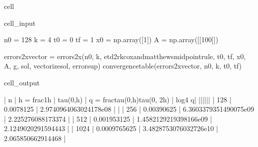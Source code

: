 \documentclass[letterpaper,10pt,english]{jupyterBook}
\begin{document}
\begin{sphinxuseclass}{cell}\begin{sphinxVerbatimInput}

\begin{sphinxuseclass}{cell_input}
\begin{sphinxVerbatim}[commandchars=\\\{\}]
n0 = 128
k = 4
t0 = 0
tf = 1
x0 = np.array([1])
A = np.array([[100]])

errors\PYGZus{}2x\PYGZus{}vector = errors\PYGZus{}2x(n0, k, etd2rk\PYGZus{}cox\PYGZus{}and\PYGZus{}matthews\PYGZus{}midpoint\PYGZus{}rule, t0, tf, x0, A, g, sol, vectorize\PYGZus{}sol, error\PYGZus{}sup)
convergence\PYGZus{}table(errors\PYGZus{}2x\PYGZus{}vector, n0, k, t0, tf)
\end{sphinxVerbatim}

\end{sphinxuseclass}\end{sphinxVerbatimInput}
\begin{sphinxVerbatimOutput}

\begin{sphinxuseclass}{cell_output}
\begin{sphinxVerbatim}[commandchars=\\\{\}]
| n | h = \PYGZdl{}\PYGZbs{}frac\PYGZob{}1\PYGZcb{}\PYGZob{}h\PYGZcb{}\PYGZdl{} | \PYGZdl{}\PYGZbs{}tau(0,h)\PYGZdl{} | q = \PYGZdl{}\PYGZbs{}frac\PYGZob{}tau(0,h)\PYGZcb{}\PYGZob{}tau(0, 2h)\PYGZcb{}\PYGZdl{} | \PYGZdl{}log\PYGZus{}4 \PYGZca{}q\PYGZdl{}|
|\PYGZhy{}\PYGZhy{}\PYGZhy{}|\PYGZhy{}\PYGZhy{}\PYGZhy{}\PYGZhy{}\PYGZhy{}\PYGZhy{}\PYGZhy{}\PYGZhy{}\PYGZhy{}\PYGZhy{}\PYGZhy{}\PYGZhy{}\PYGZhy{}\PYGZhy{}\PYGZhy{}\PYGZhy{}\PYGZhy{}|\PYGZhy{}\PYGZhy{}\PYGZhy{}\PYGZhy{}\PYGZhy{}\PYGZhy{}\PYGZhy{}\PYGZhy{}\PYGZhy{}\PYGZhy{}\PYGZhy{}|\PYGZhy{}\PYGZhy{}\PYGZhy{}\PYGZhy{}\PYGZhy{}\PYGZhy{}\PYGZhy{}\PYGZhy{}\PYGZhy{}\PYGZhy{}\PYGZhy{}\PYGZhy{}\PYGZhy{}\PYGZhy{}\PYGZhy{}\PYGZhy{}\PYGZhy{}\PYGZhy{}\PYGZhy{}\PYGZhy{}\PYGZhy{}\PYGZhy{}\PYGZhy{}\PYGZhy{}\PYGZhy{}\PYGZhy{}\PYGZhy{}\PYGZhy{}\PYGZhy{}\PYGZhy{}\PYGZhy{}\PYGZhy{}\PYGZhy{}|\PYGZhy{}\PYGZhy{}\PYGZhy{}\PYGZhy{}\PYGZhy{}\PYGZhy{}\PYGZhy{}|
 | 128 | 0.0078125 | 2.9740964063024178e\PYGZhy{}08 | \PYGZhy{} | 
 | 256 | 0.00390625 | 6.3603379351490075e\PYGZhy{}09 | 2.225276088173374 | 
 | 512 | 0.001953125 | 1.4582129219398166e\PYGZhy{}09 | 2.1249020291594443 | 
 | 1024 | 0.0009765625 | 3.4828753076032726e\PYGZhy{}10 | 2.065850662914468 | 
\end{sphinxVerbatim}

\end{sphinxuseclass}\end{sphinxVerbatimOutput}

\end{sphinxuseclass}
\end{document}
